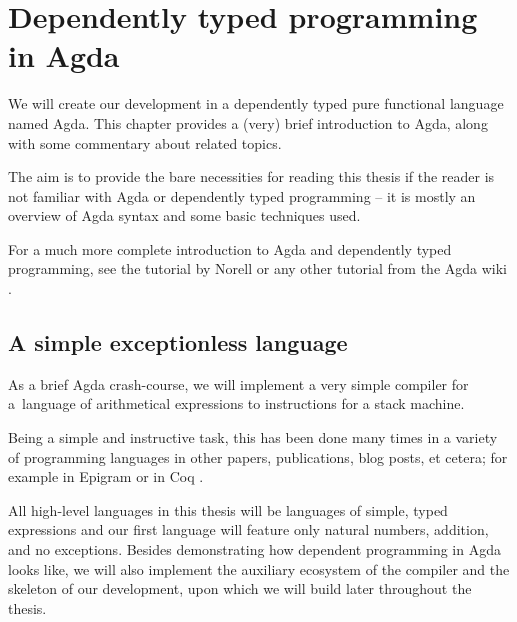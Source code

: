 \chapter{Dependently typed programming in Agda}
\label{chap:dependent-types}

We will create our development in a dependently typed pure functional language named Agda.
This chapter provides a (very) brief introduction to Agda, along with some commentary about
related topics.


The aim is to provide the bare necessities for reading this thesis if the reader is not
familiar with Agda or dependently typed programming -- it is mostly an overview of Agda syntax
and some basic techniques used.


For a much more complete introduction to Agda and dependently typed programming, see the
tutorial by Norell \cite{norell08} or any other tutorial from the Agda wiki \cite{agda-wiki}.

\section{A simple exceptionless language}
\label{sec:simple-language}

As a brief Agda crash-course, we will implement a very simple compiler for
a~language of arithmetical expressions to instructions for a stack machine.

Being a simple and instructive task, this has been done many times in a variety
of programming languages in other papers, publications, blog posts, et cetera;
for example in Epigram \cite{epigram-compiler} or in Coq \cite{chlipala:compiler}.

All high-level languages in this thesis will be languages of simple, typed
expressions and our first language will feature only natural numbers, addition,
and no exceptions. Besides demonstrating how dependent programming in Agda
looks like, we will also implement the auxiliary ecosystem of the
compiler and the skeleton of our development, upon which we will build later
throughout the thesis.

